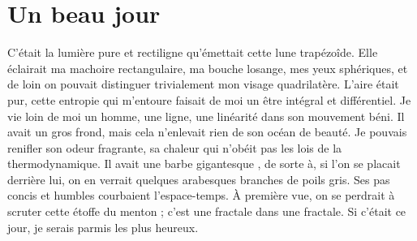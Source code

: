 \documentclass{article}
\begin{document}
    \section*{Un beau jour}

    C'était la lumière pure et rectiligne qu'émettait cette lune trapézoîde. Elle éclairait ma machoire rectangulaire,
    ma bouche losange, mes yeux sphériques, et de loin on pouvait distinguer trivialement mon visage quadrilatère. L'aire 
    était pur, cette entropie qui m'entoure faisait de moi un être intégral et différentiel. Je vie loin de moi un homme, une ligne,
    une linéarité dans son mouvement béni. Il avait un gros frond, mais cela n'enlevait rien de son océan de beauté.
    Je pouvais renifler son odeur fragrante, sa chaleur qui n'obéit pas les lois de la thermodynamique. Il avait une barbe gigantesque
    , de sorte à, si l'on se placait derrière lui, on en verrait quelques arabesques branches de poils gris. Ses pas concis et humbles
    courbaient l'espace-temps. À première vue, on se perdrait à scruter cette étoffe du menton ; c'est une fractale dans une fractale.
    Si c'était ce jour, je serais parmis les plus heureux.
\end{document}
